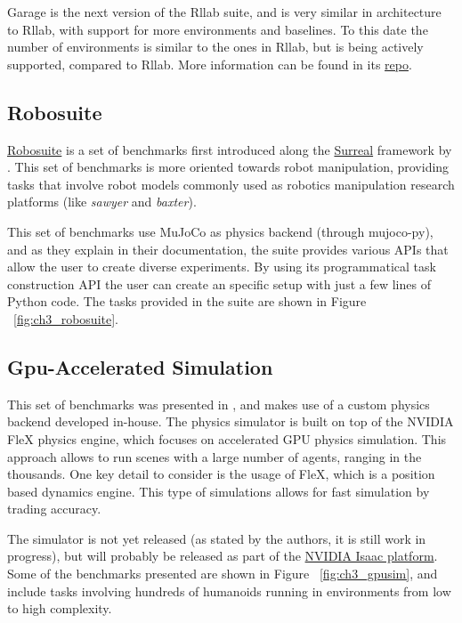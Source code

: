 Garage is the next version of the Rllab suite, and is very similar in architecture 
to Rllab, with support for more environments and baselines. To this date the number 
of environments is similar to the ones in Rllab, but is being actively supported, 
compared to Rllab. More information can be found in its \href{https://github.com/rlworkgroup/garage}{repo}.

\subsection{Robosuite}
 
\href{https://github.com/StanfordVL/robosuite/}{Robosuite} is a set of benchmarks first 
introduced along the \href{https://surreal.stanford.edu/}{Surreal} 
framework by \cite{Surreal}. This set of benchmarks is more oriented towards robot manipulation,
providing tasks that involve robot models commonly used as robotics manipulation research platforms 
(like \textit{sawyer} and \textit{baxter}).

This set of benchmarks use MuJoCo as physics backend (through mujoco-py), and as they
explain in their documentation, the suite provides various APIs that allow the user
to create diverse experiments. By using its programmatical task construction API
the user can create an specific setup with just a few lines of Python code.
The tasks provided in the suite are shown in Figure ~\ref{fig:ch3_robosuite}.

\figBenchmarksRobosuite

\subsection{Gpu-Accelerated Simulation}

This set of benchmarks was presented in \cite{GpuSim}, and makes use of a custom 
physics backend developed in-house. The physics simulator is built on top of the 
NVIDIA FleX physics engine, which focuses on accelerated GPU physics simulation. 
This approach allows to run scenes with a large number of agents, ranging in the 
thousands. One key detail to consider is the usage of FleX, which is a position 
based dynamics engine. This type of simulations allows for fast simulation by trading
accuracy. 

The simulator is not yet released (as stated by the authors, it is still 
work in progress), but will probably be released as part of the 
\href{https://developer.nvidia.com/isaac-sdk}{NVIDIA Isaac platform}. Some of the 
benchmarks presented are shown in Figure ~\ref{fig:ch3_gpusim}, and include tasks
involving hundreds of humanoids running in environments from low to high complexity.

